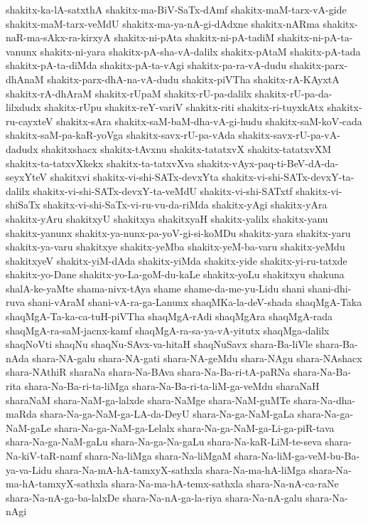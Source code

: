 {shakitx-ka-lA-satxthA
shakitx-ma-BiV-SaTx-dAmf
shakitx-maM-tarx-vA-gide
shakitx-maM-tarx-veMdU
shakitx-ma-ya-nA-gi-dAdxne
shakitx-nARma
shakitx-naR-ma-sAkx-ra-kirxyA
shakitx-ni-pAta
shakitx-ni-pA-tadiM
shakitx-ni-pA-ta-vanunx
shakitx-ni-yara
shakitx-pA-sha-vA-dalilx
shakitx-pAtaM
shakitx-pA-tada
shakitx-pA-ta-diMda
shakitx-pA-ta-vAgi
shakitx-pa-ra-vA-dudu
shakitx-parx-dhAnaM
shakitx-parx-dhA-na-vA-dudu
shakitx-piVTha
shakitx-rA-KAyxtA
shakitx-rA-dhAraM
shakitx-rUpaM
shakitx-rU-pa-dalilx
shakitx-rU-pa-da-lilxdudx
shakitx-rUpu
shakitx-reY-variV
shakitx-riti
shakitx-ri-tuyxkAtx
shakitx-ru-cayxteV
shakitx-sAra
shakitx-saM-baM-dha-vA-gi-hudu
shakitx-saM-koV-cada
shakitx-saM-pa-kaR-yoVga
shakitx-savx-rU-pa-vAda
shakitx-savx-rU-pa-vA-dadudx
shakitxshacx
shakitx-tAvxnu
shakitx-tatatxvX
shakitx-tatatxvXM
shakitx-ta-tatxvXkekx
shakitx-ta-tatxvXva
shakitx-vAyx-paq-ti-BeV-dA-da-seyxYteV
shakitxvi
shakitx-vi-shi-SATx-devxYta
shakitx-vi-shi-SATx-devxY-ta-dalilx
shakitx-vi-shi-SATx-devxY-ta-veMdU
shakitx-vi-shi-SATxtf
shakitx-vi-shiSaTx
shakitx-vi-shi-SaTx-vi-ru-vu-da-riMda
shakitx-yAgi
shakitx-yAra
shakitx-yAru
shakitxyU
shakitxya
shakitxyaH
shakitx-yalilx
shakitx-yanu
shakitx-yanunx
shakitx-ya-nunx-pa-yoV-gi-si-koMDu
shakitx-yara
shakitx-yaru
shakitx-ya-varu
shakitxye
shakitx-yeMba
shakitx-yeM-ba-varu
shakitx-yeMdu
shakitxyeV
shakitx-yiM-dAda
shakitx-yiMda
shakitx-yide
shakitx-yi-ru-tatxde
shakitx-yo-Dane
shakitx-yo-La-goM-du-kaLe
shakitx-yoLu
shakitxyu
shakuna
shalA-ke-yaMte
shama-nivx-tAya
shame
shame-da-me-yu-Lidu
shani
shani-dhi-ruva
shani-vAraM
shani-vA-ra-ga-Lanunx
shaqMKa-la-deV-shada
shaqMgA-Taka
shaqMgA-Ta-ka-ca-tuH-piVTha
shaqMgA-rAdi
shaqMgAra
shaqMgA-rada
shaqMgA-ra-saM-jacnx-kamf
shaqMgA-ra-sa-ya-vA-yitutx
shaqMga-dalilx
shaqNoVti
shaqNu
shaqNu-SAvx-va-hitaH
shaqNuSavx
shara-Ba-liVle
shara-Ba-nAda
shara-NA-galu
shara-NA-gati
shara-NA-geMdu
shara-NAgu
shara-NAshacx
shara-NAthiR
sharaNa
shara-Na-BAva
shara-Na-Ba-ri-tA-paRNa
shara-Na-Ba-rita
shara-Na-Ba-ri-ta-liMga
shara-Na-Ba-ri-ta-liM-ga-veMdu
sharaNaH
sharaNaM
shara-NaM-ga-lalxde
shara-NaMge
shara-NaM-guMTe
shara-Na-dha-maRda
shara-Na-ga-NaM-ga-LA-da-DeyU
shara-Na-ga-NaM-gaLa
shara-Na-ga-NaM-gaLe
shara-Na-ga-NaM-ga-Lelalx
shara-Na-ga-NaM-ga-Li-ga-piR-tava
shara-Na-ga-NaM-gaLu
shara-Na-ga-Na-gaLu
shara-Na-kaR-LiM-te-seva
shara-Na-kiV-taR-namf
shara-Na-liMga
shara-Na-liMgaM
shara-Na-liM-ga-veM-bu-Ba-ya-va-Lidu
shara-Na-mA-hA-tamxyX-sathxla
shara-Na-ma-hA-liMga
shara-Na-ma-hA-tamxyX-sathxla
shara-Na-ma-hA-temx-sathxla
shara-Na-nA-ca-raNe
shara-Na-nA-ga-ba-lalxDe
shara-Na-nA-ga-la-riya
shara-Na-nA-galu
shara-Na-nAgi
}
